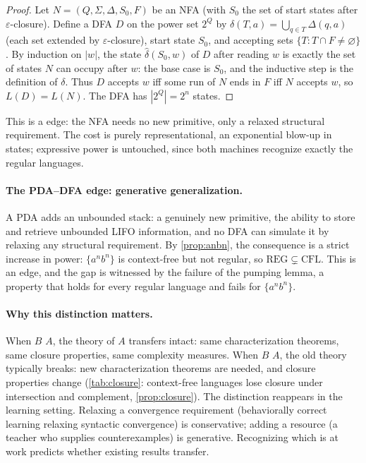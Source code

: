 \begin{proof}
Let $N = (Q, \Sigma, \Delta, S_0, F)$ be an NFA (with $S_0$ the set of start states after $\varepsilon$-closure). Define a DFA $D$ on the power set $2^Q$ by $\delta(T, a) = \bigcup_{q \in T} \Delta(q, a)$ (each set extended by $\varepsilon$-closure), start state $S_0$, and accepting sets $\{T : T \cap F \neq \varnothing\}$. By induction on $|w|$, the state $\hat\delta(S_0, w)$ of $D$ after reading $w$ is exactly the set of states $N$ can occupy after $w$: the base case is $S_0$, and the inductive step is the definition of $\delta$. Thus $D$ accepts $w$ iff some run of $N$ ends in $F$ iff $N$ accepts $w$, so $L(D) = L(N)$. The DFA has $|2^Q| = 2^n$ states.
\end{proof}

This is a  edge: the NFA needs no new primitive, only a relaxed structural requirement. The cost is purely representational, an exponential blow-up in states; expressive power is untouched, since both machines recognize exactly the regular languages.

\paragraph{The PDA--DFA edge: generative generalization.}
A PDA adds an unbounded stack: a genuinely new primitive, the ability to store and retrieve unbounded LIFO information, and no DFA can simulate it by relaxing any structural requirement. By \cref{prop:anbn}, the consequence is a strict increase in power: $\{a^n b^n\}$ is context-free but not regular, so $\mathrm{REG} \subsetneq \mathrm{CFL}$. This is an  edge, and the gap is witnessed by the failure of the pumping lemma, a property that holds for every regular language and fails for $\{a^n b^n\}$.

\paragraph{Why this distinction matters.}
When $B$  $A$, the theory of $A$ transfers intact: same characterization theorems, same closure properties, same complexity measures. When $B$  $A$, the old theory typically breaks: new characterization theorems are needed, and closure properties change (\cref{tab:closure}: context-free languages lose closure under intersection and complement, \cref{prop:closure}). The distinction reappears in the learning setting. Relaxing a convergence requirement (behaviorally correct learning relaxing syntactic convergence) is conservative; adding a resource (a teacher who supplies counterexamples) is generative. Recognizing which is at work predicts whether existing results transfer.


